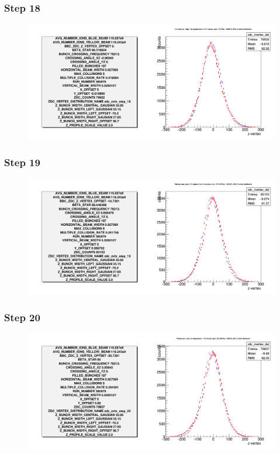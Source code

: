 \begin{frame}
  \frametitle{Step 18}
  \begin{figure}
    \includegraphics[width=\linewidth]{"./figures/tuned_simulation_step_18"}
    \label{fig:step_18}
  \end{figure}
\end{frame}

\begin{frame}
  \frametitle{Step 19}
  \begin{figure}
    \includegraphics[width=\linewidth]{"./figures/tuned_simulation_step_19"}
    \label{fig:step_19}
  \end{figure}
\end{frame}

\begin{frame}
  \frametitle{Step 20}
  \begin{figure}
    \includegraphics[width=\linewidth]{"./figures/tuned_simulation_step_20"}
    \label{fig:step_20}
  \end{figure}
\end{frame}

